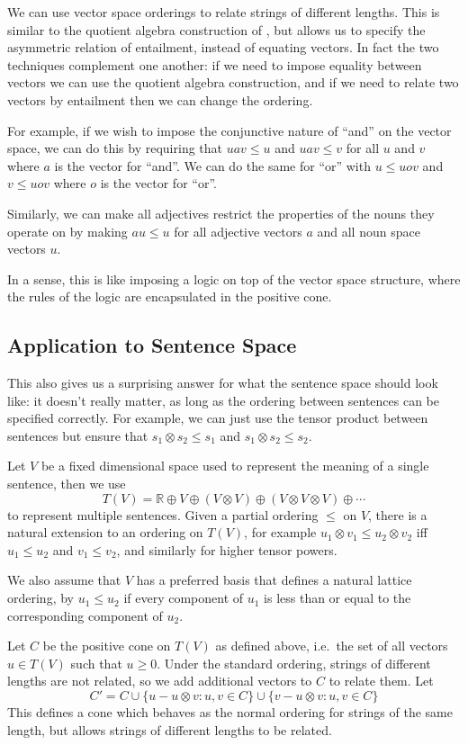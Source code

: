 \documentclass{article}
\begin{document}
We can use vector space orderings to relate strings of different
lengths. This is similar to the quotient algebra construction of
\cite{Clarke:10}, but allows us to specify the asymmetric relation of
entailment, instead of equating vectors. In fact the two techniques
complement one another: if we need to impose equality between vectors
we can use the quotient algebra construction, and if we need to relate
two vectors by entailment then we can change the ordering.

For example, if we wish to impose the conjunctive nature of ``and'' on
the vector space, we can do this by requiring that $uav \le u$ and
$uav \le v$ for all $u$ and $v$ where $a$ is the vector for
``and''. We can do the same for ``or'' with $u \le uov$ and $v\le uov$
where $o$ is the vector for ``or''.

Similarly, we can make all adjectives restrict the properties of the
nouns they operate on by making $au \le u$ for all adjective vectors
$a$ and all noun space vectors $u$.

In a sense, this is like imposing a logic on top of the vector space
structure, where the rules of the logic are encapsulated in the
positive cone.

\subsection{Application to Sentence Space}

This also gives us a surprising answer for what the sentence space
should look like: it doesn't really matter, as long as the ordering
between sentences can be specified correctly. For example, we can just
use the tensor product between sentences but ensure that $s_1\otimes s_2 \le
s_1$ and $s_1\otimes s_2\le s_2$.

Let $V$ be a fixed dimensional space used to represent the meaning of
a single sentence, then we use
$$T(V) = \mathbb{R}\oplus V \oplus (V\otimes V) \oplus (V\otimes V\otimes V) \oplus \cdots$$
to represent multiple sentences. Given a partial ordering $\le$ on
$V$, there is a natural extension to an ordering on $T(V)$, for
example $u_1\otimes v_1 \le u_2\otimes v_2$ iff $u_1 \le u_2$ and
$v_1 \le v_2$, and similarly for higher tensor powers.

We also assume that $V$ has a preferred basis that defines a natural
lattice ordering, by $u_1 \le u_2$ if every component of $u_1$ is less
than or equal to the corresponding component of $u_2$.

Let $C$ be the positive cone on $T(V)$ as defined above, i.e.~the set
of all vectors $u\in T(V)$ such that $u \ge 0$. Under the standard
ordering, strings of different lengths are not related, so we add
additional vectors to $C$ to relate them. Let
$$C' = C \cup \{ u - u\otimes v : u,v \in C \} \cup \{ v - u\otimes v : u,v \in C \}$$
This defines a cone which behaves as the normal ordering for strings
of the same length, but allows strings of different lengths to be
related.
\end{document}
